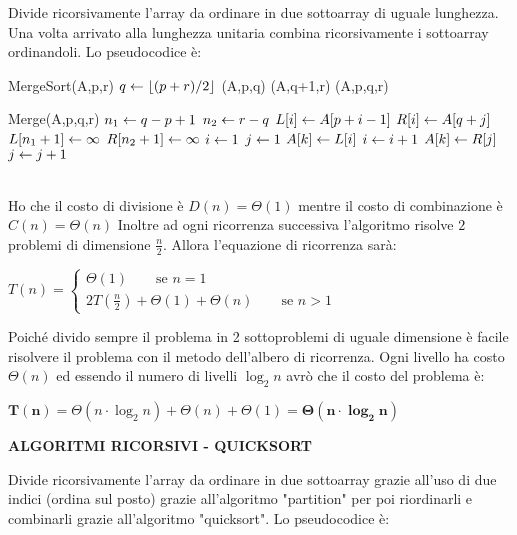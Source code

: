 \documentclass[8pt]{extarticle}
\begin{document}
\begin{formulario}
		\begin{tcenter}
		\end{tcenter}
Divide ricorsivamente l'array da ordinare in due sottoarray di uguale lunghezza. Una volta arrivato alla lunghezza unitaria combina ricorsivamente i sottoarray ordinandoli. Lo pseudocodice è:
		\begin{code}{MergeSort(A,p,r)}
\li {} 
	\li $q\leftarrow \lfloor (p+r)/2 \rfloor$ 
	\li {}(A,p,q)
	\li {}(A,q+1,r)
	\li {}(A,p,q,r)
\End
		\end{code}		
		\begin{code}{Merge(A,p,q,r)}
\li $n_1 \leftarrow q-p+1$
\li $n_2 \leftarrow r-q$
\li {} 
	\li $L[i] \leftarrow A[p+i-1]$
\End
\li {} 
	\li $R[i] \leftarrow A[q+j]$
\End
\li $L[n_1+1]\leftarrow \infty$
\li $R[n_2+1]\leftarrow \infty$
\li $i \leftarrow 1$
\li $j \leftarrow 1$
\li {}
	\li \IF{L[i]\leq R[j]}
		\li $A[k]\leftarrow L[i]$
		\li $i \leftarrow i+1$
	\li \Else
		\li $A[k]\leftarrow R[j]$
		\li $j \leftarrow j+1$
	\End
\End
		\end{code}		
\\
Ho che il costo di divisione è $D(n)=\Theta(1)$ mentre il costo di combinazione è $C(n)=\Theta(n)$ Inoltre ad ogni ricorrenza successiva l'algoritmo risolve $2$ problemi di dimensione $\frac{n}{2}$. Allora l'equazione di ricorrenza sarà: 
		\begin{tcenter}
$
T(n)=
		\begin{cases}
\Theta(1) \qquad\text{se }n=1 \\
2T(\frac{n}{2})+\Theta(1)+\Theta(n) \qquad\text{se }n>1
		\end{cases}
$
		\end{tcenter}
Poiché divido sempre il problema in 2 sottoproblemi di uguale dimensione è facile risolvere il problema con il metodo dell'albero di ricorrenza. Ogni livello ha costo $\Theta(n)$ ed essendo il numero di livelli $\log_2 n$ avrò che il costo del problema è:
		\begin{tcenter} 
$\mathbf{T(n)=}\Theta(n\cdot \log_2 n) + \Theta(n) + \Theta(1)=\mathbf{\Theta(n\cdot \log_2 n)}$
		\end{tcenter}
\myRule

		\begin{tcenter}
\bf{ALGORITMI RICORSIVI - QUICKSORT}
		\end{tcenter}
Divide ricorsivamente l'array da ordinare in due sottoarray grazie all'uso di due indici (ordina sul posto) grazie all'algoritmo "partition" per poi riordinarli e combinarli grazie all'algoritmo "quicksort". Lo pseudocodice è:


\end{formulario}
\end{document}
